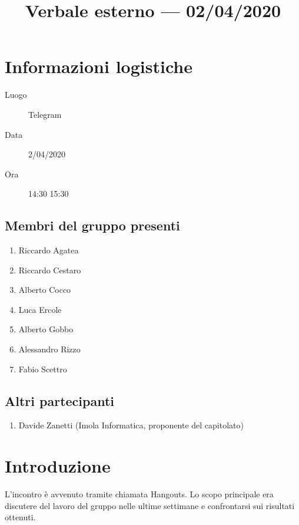 \documentclass{article}
\title{Verbale esterno --- 02/04/2020}
\begin{document}


\section{Informazioni logistiche}%
\label{sec:informazioni_logistiche}

\begin{description}
  \item [Luogo] Telegram
  \item [Data] 2/04/2020
  \item [Ora] 14:30  15:30
\end{description}

\subsection{Membri del gruppo presenti}%
\label{sub:membri_del_gruppo_presenti}

\begin{enumerate}
  \item Riccardo Agatea
  \item Riccardo Cestaro
  \item Alberto Cocco
  \item Luca Ercole
  \item Alberto Gobbo
  \item Alessandro Rizzo
  \item Fabio Scettro
\end{enumerate}


\subsection{Altri partecipanti}%
\label{sub:altri_partecipanti}

\begin{enumerate}
  \item Davide Zanetti (Imola Informatica, proponente del capitolato)
\end{enumerate}


\section{Introduzione}%
\label{sec:introduzione}
L'incontro è avvenuto tramite chiamata Hangouts.
Lo scopo principale era discutere del lavoro del gruppo nelle ultime settimane e confrontarsi sui risultati ottenuti.
\end{document}
